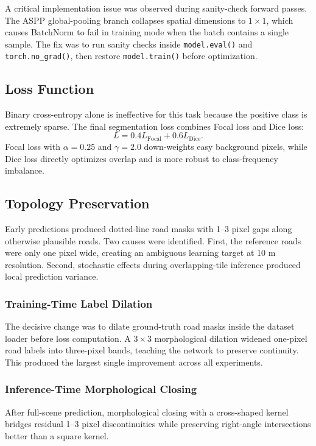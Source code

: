 ﻿\documentclass[conference]{IEEEtran}
\begin{document}
A critical implementation issue was observed during sanity-check forward passes. The ASPP global-pooling branch collapses spatial dimensions to $1\times1$, which causes BatchNorm to fail in training mode when the batch contains a single sample. The fix was to run sanity checks inside \texttt{model.eval()} and \texttt{torch.no\_grad()}, then restore \texttt{model.train()} before optimization.

\subsection{Loss Function}
Binary cross-entropy alone is ineffective for this task because the positive class is extremely sparse. The final segmentation loss combines Focal loss and Dice loss:
\begin{equation}
L = 0.4L_{\text{Focal}} + 0.6L_{\text{Dice}}.
\end{equation}
Focal loss with $\alpha=0.25$ and $\gamma=2.0$ down-weights easy background pixels, while Dice loss directly optimizes overlap and is more robust to class-frequency imbalance.

\subsection{Topology Preservation}
Early predictions produced dotted-line road masks with 1--3 pixel gaps along otherwise plausible roads. Two causes were identified. First, the reference roads were only one pixel wide, creating an ambiguous learning target at 10 m resolution. Second, stochastic effects during overlapping-tile inference produced local prediction variance.

\subsubsection{Training-Time Label Dilation}
The decisive change was to dilate ground-truth road masks inside the dataset loader before loss computation. A $3\times3$ morphological dilation widened one-pixel road labels into three-pixel bands, teaching the network to preserve continuity. This produced the largest single improvement across all experiments.

\subsubsection{Inference-Time Morphological Closing}
After full-scene prediction, morphological closing with a cross-shaped kernel bridges residual 1--3 pixel discontinuities while preserving right-angle intersections better than a square kernel.
\end{document}
